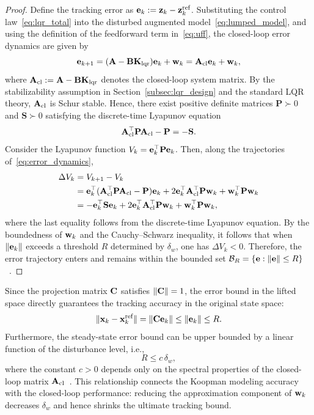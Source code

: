 \begin{proof}
Define the tracking error as $\mathbf{e}_k := \mathbf{z}_k - \mathbf{z}_k^{\text{ref}}$. Substituting the control law~\eqref{eq:lqr_total} into the disturbed augmented model~\eqref{eq:lumped_model}, and using the definition of the feedforward term in~\eqref{eq:uff}, the closed-loop error dynamics are given by
\begin{equation}
\label{eq:error_dynamics}
\mathbf{e}_{k+1} = (\mathbf{A} - \mathbf{B}\mathbf{K}_{\text{lqr}})\mathbf{e}_k + \mathbf{w}_k = \mathbf{A}_{\text{cl}}\mathbf{e}_k + \mathbf{w}_k,
\end{equation}
where $\mathbf{A}_{\text{cl}} := \mathbf{A} - \mathbf{B}\mathbf{K}_{\text{lqr}}$ denotes the closed-loop system matrix. By the stabilizability assumption in Section~\ref{subsec:lqr_design} and the standard LQR theory, $\mathbf{A}_{\text{cl}}$ is Schur stable. Hence, there exist positive definite matrices $\mathbf{P} \succ 0$ and $\mathbf{S} \succ 0$ satisfying the discrete-time Lyapunov equation
\[
\mathbf{A}_{\text{cl}}^\top \mathbf{P} \mathbf{A}_{\text{cl}} - \mathbf{P} = -\mathbf{S}.
\]
Consider the Lyapunov function $V_k = \mathbf{e}_k^\top \mathbf{P} \mathbf{e}_k$. Then, along the trajectories of~\eqref{eq:error_dynamics},
\begin{align}
\Delta V_k &= V_{k+1} - V_k \nonumber \\
&= \mathbf{e}_k^\top (\mathbf{A}_{\text{cl}}^\top \mathbf{P} \mathbf{A}_{\text{cl}} - \mathbf{P}) \mathbf{e}_k
+ 2\mathbf{e}_k^\top \mathbf{A}_{\text{cl}}^\top \mathbf{P}\mathbf{w}_k
+ \mathbf{w}_k^\top \mathbf{P}\mathbf{w}_k \nonumber \\
&= -\mathbf{e}_k^\top \mathbf{S} \mathbf{e}_k
+ 2\mathbf{e}_k^\top \mathbf{A}_{\text{cl}}^\top \mathbf{P}\mathbf{w}_k
+ \mathbf{w}_k^\top \mathbf{P}\mathbf{w}_k,
\end{align}
where the last equality follows from the discrete-time Lyapunov equation. By the boundedness of $\mathbf{w}_k$ and the Cauchy--Schwarz inequality, it follows that when $\|\mathbf{e}_k\|$ exceeds a threshold $R$ determined by $\delta_w$, one has $\Delta V_k < 0$. Therefore, the error trajectory enters and remains within the bounded set $\mathcal{B}_R = \{\mathbf{e} : \|\mathbf{e}\| \le R\}$~\cite{Blanchini2008,Khalil2002}.
\end{proof}

Since the projection matrix $\mathbf{C}$ satisfies $\|\mathbf{C}\| = 1$, the error bound in the lifted space directly guarantees the tracking accuracy in the original state space:
\[
\|\mathbf{x}_k - \mathbf{x}_k^{\text{ref}}\| = \|\mathbf{C}\mathbf{e}_k\| \le \|\mathbf{e}_k\| \le R.
\]
Furthermore, the steady-state error bound can be upper bounded by a linear function of the disturbance level, i.e.,
\[
R \le c\,\delta_w,
\]
where the constant $c > 0$ depends only on the spectral properties of the closed-loop matrix $\mathbf{A}_{\text{cl}}$~\cite{Blanchini2008}. This relationship connects the Koopman modeling accuracy with the closed-loop performance: reducing the approximation component of $\mathbf{w}_k$ decreases $\delta_w$ and hence shrinks the ultimate tracking bound.



